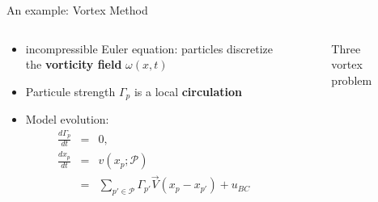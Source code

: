 \documentclass[aspectratio=169]{beamer} %
\begin{document}
\begin{frame}{An example: Vortex Method~\footnotemark[1]}
    \begin{columns}[t]
        \begin{column}{0.4\textwidth}
            \begin{itemize}
                \item incompressible Euler equation: particles discretize the \textbf{vorticity field} $\omega(x, t)$
                \item Particule strength $\Gamma_p$ is a local \textbf{circulation}
                \item Model evolution: \\
                      \begin{eqnarray*}
                          \frac{d\Gamma_p}{dt} &=& 0, \\
                          \frac{d x_p}{d t} &=& v(x_p; \mathcal P) \\
                          &=& \sum_{p' \in \mathcal P} \Gamma_{p'} \vec{V}(x_p - x_{p'}) + u_{BC} \\
                      \end{eqnarray*}
            \end{itemize}
        \end{column}
        \begin{column}{0.6\textwidth}
            \begin{figure}
                \centering
                \caption*{Three vortex problem}
            \end{figure}
        \end{column}
    \end{columns}
\end{frame}
\end{document}
